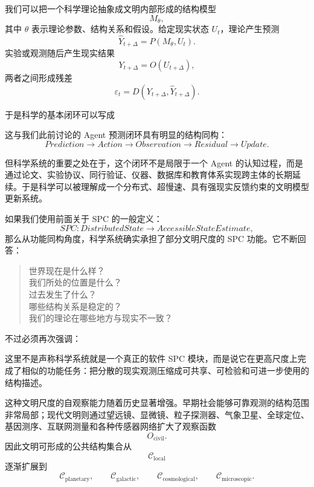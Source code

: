 我们可以把一个科学理论抽象成文明内部形成的结构模型
\[
M_\theta,
\]
其中 $\theta$ 表示理论参数、结构关系和假设。给定现实状态 $U_t$，理论产生预测
\[
\hat{Y}_{t+\Delta}
=
P(M_\theta,U_t).
\]
实验或观测随后产生现实结果
\[
Y_{t+\Delta}
=
O(U_{t+\Delta}),
\]
两者之间形成残差
\[
\varepsilon_t
=
D(
Y_{t+\Delta},
\hat{Y}_{t+\Delta}
).
\]

于是科学的基本闭环可以写成
\begin{statementbox}
\centering
{}
\end{statementbox}

这与我们此前讨论的 Agent 预测闭环具有明显的结构同构：
\[
Prediction
\rightarrow
Action
\rightarrow
Observation
\rightarrow
Residual
\rightarrow
Update.
\]

但科学系统的重要之处在于，这个闭环不是局限于一个 Agent 的认知过程，而是通过论文、实验协议、同行验证、仪器、数据库和教育体系实现跨主体的长期延续。于是科学可以被理解成一个分布式、超慢速、具有强现实反馈约束的文明模型更新系统。

如果我们使用前面关于 SPC 的一般定义：
\[
SPC:
DistributedState
\rightarrow
AccessibleStateEstimate,
\]
那么从功能同构角度，科学系统确实承担了部分文明尺度的 SPC 功能。它不断回答：

\begin{quote}
世界现在是什么样？\\
我们所处的位置是什么？\\
过去发生了什么？\\
哪些结构关系是稳定的？\\
我们的理论在哪些地方与现实不一致？
\end{quote}

不过必须再次强调：
\begin{statementbox}
\centering
{}
\end{statementbox}
这里不是声称科学系统就是一个真正的软件 SPC 模块，而是说它在更高尺度上完成了相似的功能任务：把分散的现实观测压缩成可共享、可检验和可进一步使用的结构描述。

这种文明尺度的自观察能力随着历史显著增强。早期社会能够可靠观测的结构范围非常局部；现代文明则通过望远镜、显微镜、粒子探测器、气象卫星、全球定位、基因测序、互联网测量和各种传感器网络扩大了观察函数
\[
O_{\mathrm{civil}}.
\]
因此文明可形成的公共结构集合从
\[
\mathcal{C}_{\mathrm{local}}
\]
逐渐扩展到
\[
\mathcal{C}_{\mathrm{planetary}},
\qquad
\mathcal{C}_{\mathrm{galactic}},
\qquad
\mathcal{C}_{\mathrm{cosmological}},
\qquad
\mathcal{C}_{\mathrm{microscopic}}.
\]

